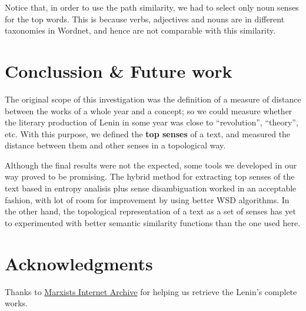 \documentclass{pnastwo}
\begin{document}
\begin{article}
Notice that, in order to use the path similarity, we had to select only noun senses for the top words. This is because verbs, adjectives and nouns are in different taxonomies in Wordnet, and hence are not comparable with this similarity. 





\section{Conclussion \& Future work}

The original scope of this investigation was the definition of a measure of distance between the works of a whole year and a concept; so we could measure whether the literary production of Lenin in some year was close to ``revolution'', ``theory'', etc.  With this purpose, we defined the \textbf{top senses} of a text, and measured the distance between them and other senses in a topological way.

Although the final results were not the expected, some tools we developed in our way proved to be promising. The hybrid method for extracting top senses of the text based in entropy analisis plus sense disambiguation worked in an acceptable fashion, with lot of room for improvement by using better WSD algorithms. In the other hand, the topological representation of a text as a set of senses has yet to experimented with better semantic similarity functions than the one used here. 

\section{Acknowledgments}
Thanks to \hyperlink{https://www.marxists.org}{Marxists Internet Archive} for helping us retrieve the Lenin's complete works.










\end{article}
\end{document}

